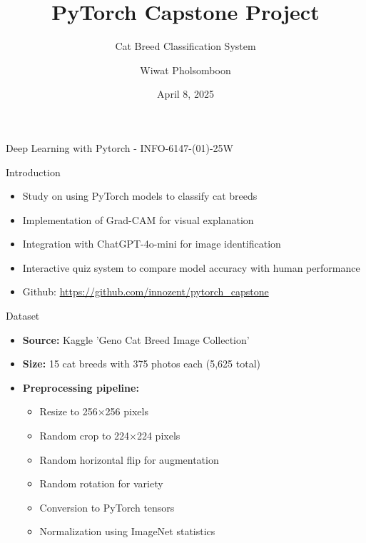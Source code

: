 \documentclass{beamer}
\title{\textcolor{maincolor}{\LARGE PyTorch Capstone Project}}
\subtitle{\textcolor{secondcolor}{Cat Breed Classification System}}
\author{\textcolor{secondcolor}{Wiwat Pholsomboon}}
\date{\textcolor{secondcolor}{April 8, 2025}}
\begin{document}
\begin{frame}
    \titlepage
    \begin{center}
        \textcolor{secondcolor}{Deep Learning with Pytorch - INFO-6147-(01)-25W}
    \end{center}
\end{frame}

\begin{frame}{Introduction}
    \begin{itemize}
        \item Study on using PyTorch models to classify cat breeds
        \item Implementation of Grad-CAM for visual explanation
        \item Integration with ChatGPT-4o-mini for image identification
        \item Interactive quiz system to compare model accuracy with human performance
        \item Github: \href{https://github.com/innozent/pytorch_capstone}{https://github.com/innozent/pytorch\_capstone}
    \end{itemize}
\end{frame}

\begin{frame}{Dataset}
    \begin{itemize}
        \item \textbf{Source:} Kaggle 'Geno Cat Breed Image Collection'
        \item \textbf{Size:} 15 cat breeds with 375 photos each (5,625 total)
        \item \textbf{Preprocessing pipeline:}
        \begin{itemize}
            \item Resize to 256×256 pixels
            \item Random crop to 224×224 pixels
            \item Random horizontal flip for augmentation
            \item Random rotation for variety
            \item Conversion to PyTorch tensors
            \item Normalization using ImageNet statistics
        \end{itemize}
    \end{itemize}
\end{frame}
\end{document}
